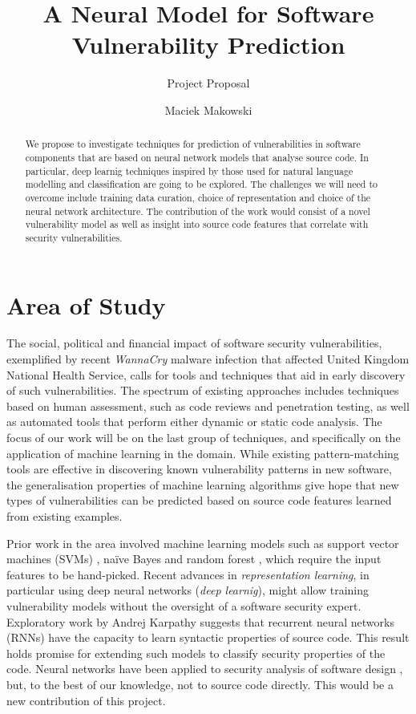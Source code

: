 \documentclass[twoside,a4paper]{scrartcl}
\begin{document}
\title{A Neural Model for Software Vulnerability Prediction}
\subtitle{Project Proposal} 
\author{Maciek Makowski}
\maketitle

\begin{abstract}
We propose to investigate techniques for prediction of vulnerabilities in
software components that are based on neural network models that analyse
source code. In particular, deep learnig techniques inspired by those used
for natural language modelling and classification are going to be explored.
The challenges we will need to overcome include training data curation,
choice of representation and choice of the neural network architecture.
The contribution of the work would consist of a novel vulnerability model
as well as insight into source code features that correlate with security
vulnerabilities.
\end{abstract}

\section{Area of Study}

The social, political and financial impact of software security vulnerabilities, 
exemplified by recent \emph{WannaCry} malware infection that affected
United Kingdom National Health Service, calls 
for tools and techniques that aid in early discovery of such vulnerabilities. 
The spectrum of existing approaches includes techniques based on human assessment,
such as code reviews and penetration testing, as well as automated tools that perform
either dynamic or static code analysis. The focus of our work will be on the last 
group of techniques, and specifically on the application of machine learning in the
domain. While existing pattern-matching tools are effective in discovering known
vulnerability patterns in new software, the generalisation properties of machine 
learning algorithms give hope that new types of vulnerabilities can be predicted
based on source code features learned from existing examples. 

Prior work in the area involved machine learning models such as support vector
machines (SVMs) \cite{neuhaus2007predicting,perl2015vccfinder}, naïve Bayes and 
random forest
\cite{scandariato2014predicting}, which require the input features to be hand-picked.
Recent advances in \emph{representation learning}, in particular using deep
neural networks (\emph{deep learnig}), might allow training vulnerability models 
without the oversight of a software security expert. Exploratory work by Andrej 
Karpathy \cite{karpathy2015unreasonable} suggests that recurrent neural networks 
(RNNs) have the capacity to learn syntactic properties of source code.
This result holds promise for extending such models to classify security properties
of the code. Neural networks have been applied to security analysis of software 
design \cite{adebiyi2013security}, but, to the best of our knowledge, not to
source code directly. This would be a new contribution of this project.
\end{document}

